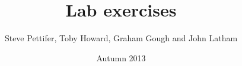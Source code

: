 \documentclass[11pt, a4paper]{report}
\title{Lab exercises}
\date{Autumn 2013}
\author{Steve Pettifer, Toby Howard, Graham Gough and John Latham}
\begin{document}




\renewcommand{\chaptername}{COMP10120 Lab Session}
\setcounter{chapter}{0}






\printbibliography
\end{document}
